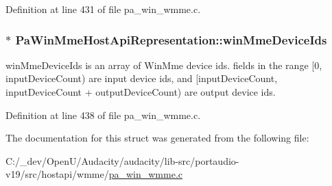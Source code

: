 Definition at line 431 of file pa\+\_\+win\+\_\+wmme.\+c.

\subsubsection[{\texorpdfstring{win\+Mme\+Device\+Ids}{winMmeDeviceIds}}]{$\ast$ Pa\+Win\+Mme\+Host\+Api\+Representation\+::win\+Mme\+Device\+Ids}\hypertarget{struct_pa_win_mme_host_api_representation_a8ebc9f7c215b507c2bf85fb309f4b0f8}{}\label{struct_pa_win_mme_host_api_representation_a8ebc9f7c215b507c2bf85fb309f4b0f8}
win\+Mme\+Device\+Ids is an array of Win\+Mme device ids. fields in the range \mbox{[}0, input\+Device\+Count) are input device ids, and \mbox{[}input\+Device\+Count, input\+Device\+Count + output\+Device\+Count) are output device ids. 

Definition at line 438 of file pa\+\_\+win\+\_\+wmme.\+c.



The documentation for this struct was generated from the following file\+:\begin{DoxyCompactItemize}
\item 
C\+:/\+\_\+dev/\+Open\+U/\+Audacity/audacity/lib-\/src/portaudio-\/v19/src/hostapi/wmme/\hyperlink{pa__win__wmme_8c}{pa\+\_\+win\+\_\+wmme.\+c}\end{DoxyCompactItemize}
